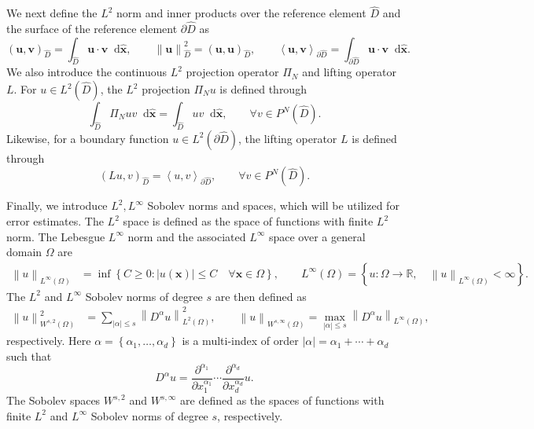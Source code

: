 \documentclass[10pt]{amsart}
\theoremstyle{definition}
\theoremstyle{lemma}
\theoremstyle{theorem}
\theoremstyle{assumption}
\renewcommand{\hat}{\widehat}
\newcommand{\pd}[2]{\frac{\partial#1}{\partial#2}}
\newcommand{\nor}[1]{\left\| #1 \right\|}
\newcommand{\LRp}[1]{\left( #1 \right)}
\newcommand{\LRa}[1]{\left\langle #1 \right\rangle}
\newcommand{\LRb}[1]{\left| #1 \right|}
\newcommand{\LRc}[1]{\left\{ #1 \right\}}
\newcommand*\diff[1]{\mathop{}\!{\mathrm{d}#1}} %
\begin{document}
We next define the $L^2$ norm and inner products over the reference element $\hat{D}$ and the surface of the reference element $\partial \hat{D}$ as
\[
  \LRp{\bm{u},\bm{v}}_{\hat{D}} =  \int_{\widehat{D}} \bm{u}\cdot\bm{v} \diff{\hat{\bm{x}}}, \qquad \nor{\bm{u}}^2_{\hat{D}} = (\bm{u},\bm{u})_{\hat{D}}, \qquad \LRa{\bm{u},\bm{v}}_{\partial \hat{D}} = \int_{\partial \hat{D}} \bm{u} \cdot \bm{v} \diff{\hat{\bm{x}}}.
\]
We also introduce the continuous $L^2$ projection operator $\Pi_N$ and lifting operator $L$.  For $u \in L^2\LRp{\widehat{D}}$, the $L^2$ projection $\Pi_N u$ is defined through
\begin{equation}
\int_{\widehat{D}} \Pi_N u v \diff{\hat{\bm{x}}} = \int_{\widehat{D}} u v \diff{\hat{\bm{x}}}, \qquad \forall v\in P^N\LRp{\hat{D}}.
\label{eq:l2proj}
\end{equation}
Likewise, for a boundary function $u \in L^2\LRp{\partial \hat{D}}$, the lifting operator $L$ \cite{hesthaven2007nodal, di2011mathematical} is defined through 
\begin{equation}
\LRp{L u,v}_{\hat{D}} = \LRa{u,v}_{\partial \hat{D}}, \qquad \forall v \in P^N\LRp{\hat{D}}.
\label{eq:lift}
\end{equation}

Finally, we introduce $L^2, L^{\infty}$ Sobolev norms and spaces, which will be utilized for error estimates.  The $L^2$ space is defined as the space of functions with finite $L^2$ norm.  The Lebesgue $L^\infty$ norm and the associated $L^\infty$ space over a general domain $\Omega$ are 
\begin{align*}
\nor{u}_{L^{\infty}\LRp{\Omega}} &= \inf\LRc{C \geq 0: \LRb{u\LRp{\bm{x}}} \leq C \quad \forall \bm{x}\in \Omega}, \qquad
L^{\infty}\LRp{\Omega} = \LRc{u: \Omega\rightarrow \mathbb{R}, \quad \nor{u}_{L^{\infty}\LRp{\Omega}} < \infty}.
\end{align*}
The $L^2$ and $L^{\infty}$ Sobolev norms of degree $s$ are then defined  as
\begin{align*}
\nor{u}_{W^{s,2}\LRp{\Omega}}^2 &= {\sum_{\LRb{\alpha}\leq s} \nor{ D^{\alpha} u}_{L^2\LRp{\Omega}}^2}, \qquad \nor{u}_{W^{s,\infty}\LRp{\Omega}} = \max_{\LRb{\alpha}\leq s} \nor{D^{\alpha}u}_{L^{\infty}\LRp{\Omega}},
\end{align*}
respectively.  Here $\alpha = \LRc{\alpha_1,\ldots,\alpha_d}$ is a multi-index
of order $\LRb{\alpha} = \alpha_1 + \cdots + \alpha_d$ such that
\[
D^{\alpha}u = \pd{^{\alpha_1}}{x_1^{\alpha_1}}\cdots\pd{^{\alpha_d}}{x_d^{\alpha_d}} u.
\]
The Sobolev spaces $W^{s,2}$ and $W^{s,\infty}$ are defined as the spaces of functions with finite $L^2$ and $L^\infty$ Sobolev norms of degree $s$, respectively.
\end{document}
